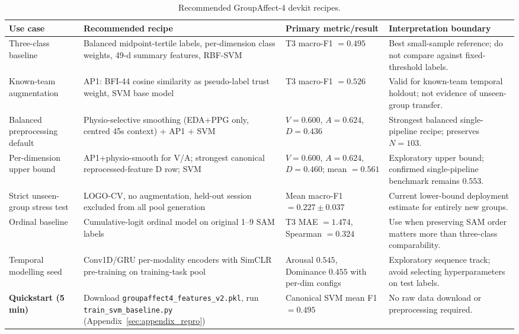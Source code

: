 \documentclass[sigconf,nonacm]{acmart}
\begin{document}
\begin{table}[t]
\caption{Recommended GroupAffect-4 devkit recipes.}
\label{tab:recipes}
\centering
\setlength{\tabcolsep}{4pt}
\small
\begin{tabular}{p{}p{}p{}p{}}
\toprule
\textbf{Use case} & \textbf{Recommended recipe} & \textbf{Primary metric/result} &
\textbf{Interpretation boundary} \\
\midrule
Three-class baseline &
Balanced midpoint-tertile labels, per-dimension class weights, 49-d summary
features, RBF-SVM &
T3 macro-F1 $=0.495$ &
Best small-sample reference; do not compare against fixed-threshold labels. \\
\addlinespace
Known-team augmentation &
AP1: BFI-44 cosine similarity as pseudo-label trust weight, SVM base model &
T3 macro-F1 $=0.526$ &
Valid for known-team temporal holdout; not evidence of unseen-group transfer. \\
\addlinespace
Balanced preprocessing default &
Physio-selective smoothing (EDA+PPG only, centred 45s context) + AP1 + SVM &
$V{=}0.600$, $A{=}0.624$, $D{=}0.436$ &
Strongest balanced single-pipeline recipe; preserves $N{=}103$. \\
\addlinespace
Per-dimension upper bound &
AP1+physio-smooth for V/A; strongest canonical reprocessed-feature D row; SVM &
$V{=}0.600$, $A{=}0.624$, $D{=}0.460$; mean $=0.561$ &
Exploratory upper bound; confirmed single-pipeline benchmark remains $0.553$. \\
\addlinespace
Strict unseen-group stress test &
LOGO-CV, no augmentation, held-out session excluded from all pool generation &
Mean macro-F1 $=0.227\pm0.037$ &
Current lower-bound deployment estimate for entirely new groups. \\
\addlinespace
Ordinal baseline &
Cumulative-logit ordinal model on original 1--9 SAM labels &
T3 MAE $=1.474$, Spearman $=0.324$ &
Use when preserving SAM order matters more than three-class comparability. \\
\addlinespace
Temporal modelling seed &
Conv1D/GRU per-modality encoders with SimCLR pre-training on training-task pool &
Arousal $0.545$, Dominance $0.455$ with per-dim configs &
Exploratory sequence track; avoid selecting hyperparameters on test labels. \\
\addlinespace
\textbf{Quickstart (5 min)} &
Download \texttt{groupaffect4\_features\_v2.pkl}, run
\texttt{train\_svm\_baseline.py} (Appendix~\ref{sec:appendix_repro}) &
Canonical SVM mean F1 $=0.495$ &
No raw data download or preprocessing required. \\
\bottomrule
\end{tabular}
\end{table}
\end{document}
